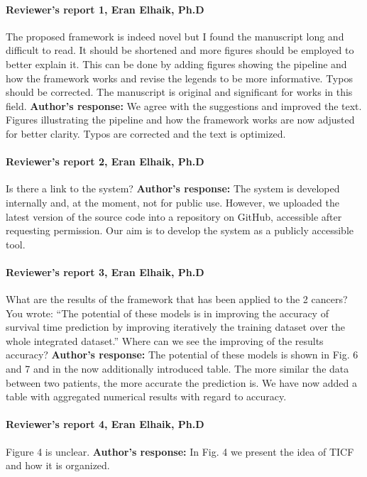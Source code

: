 \documentclass{bmcart}
\begin{document}
\paragraph {Reviewer's report 1, Eran Elhaik, Ph.D} 
The proposed framework is indeed novel but I found the manuscript long and difficult to read. It should be shortened and more figures should be employed to better explain it. This can be done by adding figures showing the pipeline and how the framework works and revise the legends to be more informative. Typos should be corrected. The manuscript is original and significant for works in this field.
\newline \textbf{Author's response:}
We agree with the suggestions and improved the text. Figures illustrating the pipeline and how the framework works are now adjusted for better clarity. Typos are corrected and the text is optimized.


\paragraph {Reviewer's report 2, Eran Elhaik, Ph.D}
Is there a link to the system?
\newline \textbf{Author's response:}
The system is developed internally and, at the moment, not for public use. However, we uploaded the latest version of the source code into a repository on GitHub, accessible after requesting permission. Our aim is to develop the system as a publicly accessible tool.

\paragraph {Reviewer's report 3,  Eran Elhaik, Ph.D}
What are the results of the framework that has been applied to the 2 cancers? You wrote: “The potential of these models is in improving the accuracy of survival time prediction by improving iteratively the training dataset over the whole integrated dataset.” Where can we see the improving of the results accuracy?
\newline \textbf{Author's response:}
The potential of these models is shown in Fig. 6 and 7 and in the now additionally introduced table. The more similar the data between two patients, the more accurate the prediction is. We have now added a table with aggregated numerical results with regard to accuracy.

\paragraph {Reviewer's report 4, Eran Elhaik, Ph.D}
Figure 4 is unclear.
\newline \textbf{Author's response:}
In Fig. 4 we present the idea of TICF and how it is organized.
\end{document}

